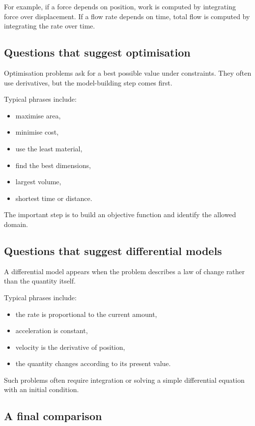 For example, if a force depends on position, work is computed by integrating force over displacement. If a flow rate depends on time, total flow is computed by integrating the rate over time.

\subsection*{Questions that suggest optimisation}

Optimisation problems ask for a best possible value under constraints. They often use derivatives, but the model-building step comes first.

Typical phrases include:
\begin{itemize}
\item maximise area,
\item minimise cost,
\item use the least material,
\item find the best dimensions,
\item largest volume,
\item shortest time or distance.
\end{itemize}

The important step is to build an objective function and identify the allowed domain.

\subsection*{Questions that suggest differential models}

A differential model appears when the problem describes a law of change rather than the quantity itself.

Typical phrases include:
\begin{itemize}
\item the rate is proportional to the current amount,
\item acceleration is constant,
\item velocity is the derivative of position,
\item the quantity changes according to its present value.
\end{itemize}

Such problems often require integration or solving a simple differential equation with an initial condition.

\subsection*{A final comparison}

